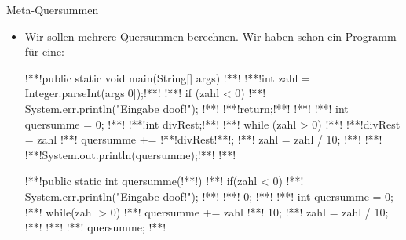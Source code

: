 {
\begin{frame}[fragile]{Meta-Quersummen}
\begin{itemize}[<+(1)->]
    \item<2-> Wir sollen mehrere Quersummen berechnen. Wir haben schon ein Programm für eine:\vfill{}
\columns[onlytextwidth,c]
\begin{plainjava}
!**!public static void main(String[] args) {
!**!   !**!int zahl = Integer.parseInt(args[0]);!**!
!**!   if (zahl < 0) {
!**!      System.err.println("Eingabe doof!");
!**!      !**!return;!**!
!**!   }
!**!   int quersumme = 0;
!**!   !**!int divRest;!**!
!**!   while (zahl > 0) {
!**!      !**!divRest = zahl %
!**!      quersumme += !**!divRest!**!;
!**!      zahl = zahl / 10;
!**!   }
!**!   !**!System.out.println(quersumme);!**!
!**!}
\end{plainjava}
\column{0pt}
\clap{$\to$}
\makeatletter
\begin{plainjava}
!**!public static int quersumme(!**!) {
!**!    if(zahl < 0){
!**!        System.err.println("Eingabe doof!");
!**!        !**! 0;
!**!    }
!**!    int quersumme = 0;
!**!    while(zahl > 0){
!**!        quersumme += zahl !**! 10;
!**!        zahl = zahl / 10;
!**!    }
!**!    !**! quersumme;
!**!}
\end{plainjava}
\endcolumns
\end{itemize}
\end{frame}}
